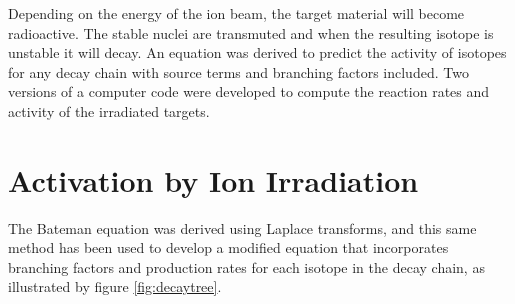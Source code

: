 Depending on the energy of the ion beam, the target material will become radioactive.  The stable nuclei are transmuted and when the resulting isotope is unstable it will decay.  An equation was derived to predict the activity of isotopes for any decay chain with source terms and branching factors included.  Two versions of a computer code were developed to compute the reaction rates and activity of the irradiated targets.




\section{Activation by Ion Irradiation}



The Bateman equation was derived using Laplace transforms, and this same method has been used to develop a modified equation that incorporates branching factors and production rates for each isotope in the decay chain, as illustrated by figure \ref{fig:decaytree}.


